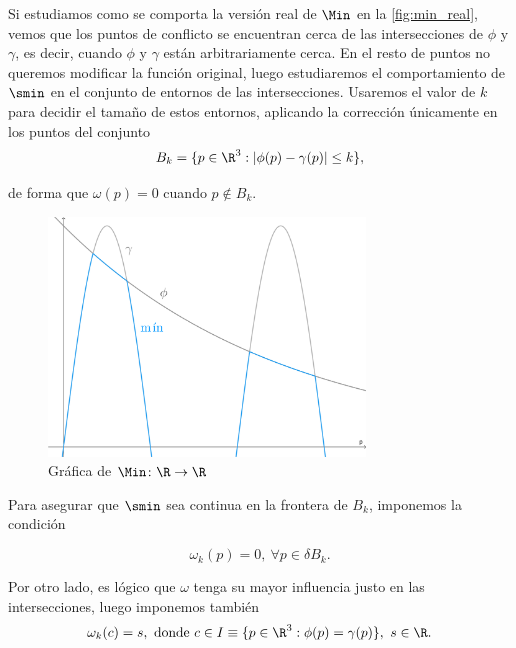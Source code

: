 Si estudiamos como se comporta la versión real de $\Min$ en la \autoref{fig:min_real}, vemos que los puntos de conflicto se encuentran cerca de las intersecciones de $\phi$ y $\gamma$, es decir, cuando $\phi$ y $\gamma$ están arbitrariamente cerca. En el resto de puntos no queremos modificar la función original, luego estudiaremos el comportamiento de $\smin$ en el conjunto de entornos de las intersecciones. Usaremos el valor de $k$ para decidir el tamaño de estos entornos, aplicando la corrección únicamente en los puntos del conjunto
\begin{equation*}
    B_{k} = \{p\in\R^3 : |\phi(p)-\gamma(p)| \le k\},
\end{equation*}

de forma que $\omega(p) = 0$ cuando $p\notin B_{k}$.\newline

\begin{figure}[t]
    \centering
    \includegraphics[width=0.75\textwidth]{Plantilla-TFG-master/img/smooth_real.png}
    \caption{Gráfica de $\Min\colon \R\to\R$}
    \label{fig:min_real}
\end{figure}

Para asegurar que $\smin$ sea continua en la frontera de $B_{k}$, imponemos la condición 

\begin{equation*}
    \omega_k(p) = 0,\ \forall p \in \delta B_{k}.
\end{equation*}

Por otro lado, es lógico que $\omega$ tenga su mayor influencia justo en las intersecciones, luego imponemos también 
\begin{equation*}
    \omega_k(c) = s, \text{ donde } c \in I \equiv \{p\in\R^3 : \phi(p) = \gamma(p)\},\ s\in \R.
\end{equation*}

